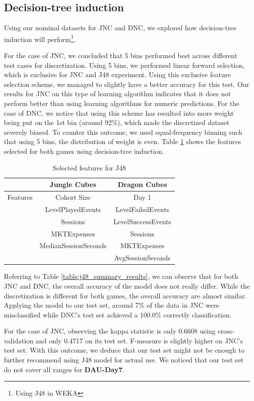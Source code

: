 \subsection{Decision-tree induction}
Using our nominal datasets for JNC and DNC, we explored how decision-tree induction will perform\footnote{Using J48 in WEKA}. 

For the case of JNC, we concluded that 5 bins performed best across different test cases for discretization. Using 5 bins, we performed linear forward selection, which is exclusive for JNC and J48 experiment. Using this exclusive feature selection scheme, we managed to slightly have a better accuracy for this test. Our results for JNC on this type of learning algorithm indicates that it does not perform better than using learning algorithms for numeric predictions. For the case of DNC, we notice that using this scheme has resulted into more weight being put on the 1st bin (around 92\%), which made the discretized dataset severely biased. To counter this outcome, we used equal-frequency binning such that using 5 bins, the distribution of weight is even. Table \ref{table:j48_features} shows the features selected for both games using decision-tree induction.

\begin{table}[h]
\centering
\caption{Selected features for J48}
\label{table:j48_features}
\begin{tabular}{|c|c|c|}
\hline 
 & Jungle Cubes & Dragon Cubes\\ 
\hline 
Features & Cohort Size & Day 1 
\\& LevelPlayedEvents & LevelFailedEvents
\\& Sessions & LevelSuccessEvents 
\\& MKTExpenses & Sessions 
\\& MedianSessionSeconds &MKTExpenses
\\&  &AvgSessionSeconds\\ 
\hline 
\end{tabular}
\end{table}

Referring to Table \ref{table:j48_summary_results}, we can observe that for both JNC and DNC, the overall accuracy of the model does not really differ. While the discretization is different for both games, the overall accuracy are almost similar. Applying the model to our test set, around 7\% of the data in JNC were misclassified while DNC's test set achieved a 100.0\% correctly classification.

For the case of JNC, observing the kappa statistic is only 0.6608 using cross-validation and only 0.4717 on its test set. F-measure is slightly higher on JNC's test set. With this outcome, we deduce that our test set might not be enough to further recommend using J48 model for actual use. We noticed that our test set do not cover all ranges for \textbf{DAU-Day7}.

